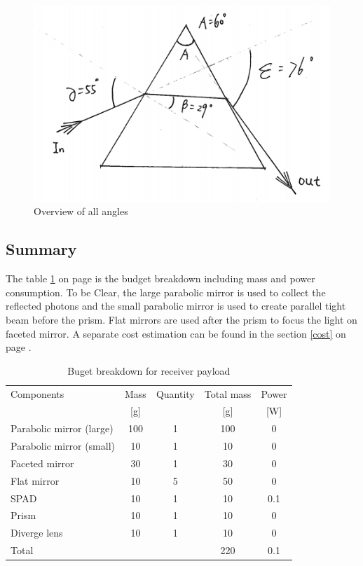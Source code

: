 \begin{figure}[ht!]
\centering
\includegraphics[scale = 0.8]{chapters/img/prism_final.png}
\caption{Overview of all angles}
\label{fig:prism_final}
\end{figure}

\subsection{Summary}
\label{sum}
The table \ref{tab:receiverbudget} on page \pageref{tab:receiverbudget} is the budget breakdown including mass and power consumption. To be Clear, the large parabolic mirror is used to collect the reflected photons and the small parabolic mirror is used to create parallel tight beam before the prism. Flat mirrors are used after the prism to focus the light on faceted mirror. A separate cost estimation can be found in the section \ref{cost} on page \pageref{cost}.

\begin{table}[ht!]
\centering
\begin{tabular}{l | c | c | c | c }
Components                & Mass  & Quantity & Total mass & Power\\ 
                          &  [g]  &          &     [g]    &  [W] \\\hline\hline
Parabolic mirror (large)  &  100  &     1    &     100    &   0   \\
Parabolic mirror (small)  &  10   &     1    &     10     &   0   \\
Faceted mirror            &  30   &     1    &     30     &   0   \\ 
Flat mirror               &  10   &     5    &     50     &   0   \\
\acs{SPAD}                &  10   &     1    &     10     &   0.1 \\
Prism                     &  10   &     1    &     10     &   0   \\ 
Diverge lens              &  10   &     1    &     10     &   0   \\ \hline
Total                     &       &          &     220    &   0.1 \\
\end{tabular}
\caption{Buget breakdown for receiver payload}
\label{tab:receiverbudget}
\end{table}


